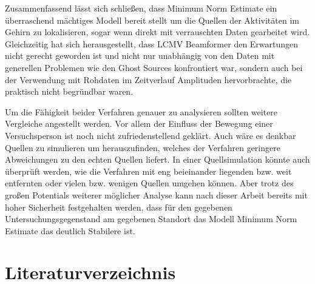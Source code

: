 \documentclass[doc,a4paper,12pt]{apa6}
\begin{document}
Zusammenfassend lässt sich schließen, dass Minimum Norm Estimate ein überraschend mächtiges Modell bereit stellt um die Quellen der Aktivitäten im Gehirn zu lokalisieren, sogar wenn direkt mit verrauschten Daten gearbeitet wird. Gleichzeitig hat sich herausgestellt, dass LCMV Beamformer den Erwartungen nicht gerecht geworden ist und nicht nur unabhängig von den Daten mit generellen Problemen wie den Ghost Sources konfrontiert war, sondern auch bei der Verwendung mit Rohdaten im Zeitverlauf Amplituden hervorbrachte, die praktisch nicht begründbar waren.

Um die Fähigkeit beider Verfahren genauer zu analysieren sollten weitere Vergleiche angestellt werden. Vor allem der Einfluss der Bewegung einer Versuchsperson ist noch nicht zufriedenstellend geklärt. Auch wäre es denkbar Quellen zu simulieren um herauszufinden, welches der Verfahren geringere Abweichungen zu den echten Quellen liefert. In einer Quellsimulation könnte auch überprüft werden, wie die Verfahren mit eng beieinander liegenden bzw. weit entfernten oder vielen bzw. wenigen Quellen umgehen können. Aber trotz des großen Potentials weiterer möglicher Analyse kann nach dieser Arbeit bereits mit hoher Sicherheit festgehalten werden, dass für den gegebenen Untersuchungsgegenstand am gegebenen Standort das Modell Minimum Norm Estimate das deutlich Stabilere ist.


\newpage
\section{Literaturverzeichnis}

\printbibliography[heading=none]

%
\end{document}
